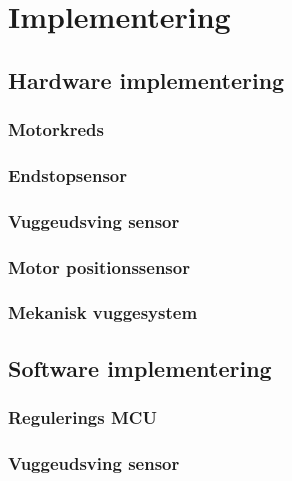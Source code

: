 \section{Implementering}
\subsection{Hardware implementering}
\subsubsection{Motorkreds}

\subsubsection{Endstopsensor}

\subsubsection{Vuggeudsving sensor}

\subsubsection{Motor positionssensor}

\subsubsection{Mekanisk vuggesystem}


\subsection{Software implementering}
\subsubsection{Regulerings MCU}
\subsubsection{Vuggeudsving sensor}
